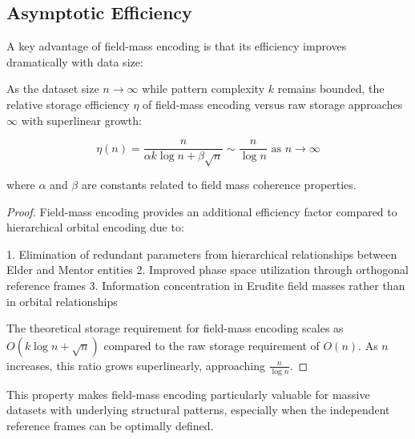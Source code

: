 \subsection{Asymptotic Efficiency}

A key advantage of field-mass encoding is that its efficiency improves dramatically with data size:

\begin{proposition}
As the dataset size $n \to \infty$ while pattern complexity $k$ remains bounded, the relative storage efficiency $\eta$ of field-mass encoding versus raw storage approaches $\infty$ with superlinear growth:

\begin{equation}
\eta(n) = \frac{n}{\alpha k \log n + \beta \sqrt{n}} \sim \frac{n}{\log n} \text{ as } n \to \infty
\end{equation}

where $\alpha$ and $\beta$ are constants related to field mass coherence properties.
\end{proposition}

\begin{proof}
Field-mass encoding provides an additional efficiency factor compared to hierarchical orbital encoding due to:

1. Elimination of redundant parameters from hierarchical relationships between Elder and Mentor entities
2. Improved phase space utilization through orthogonal reference frames
3. Information concentration in Erudite field masses rather than in orbital relationships

The theoretical storage requirement for field-mass encoding scales as $O(k \log n + \sqrt{n})$ compared to the raw storage requirement of $O(n)$. As $n$ increases, this ratio grows superlinearly, approaching $\frac{n}{\log n}$.
\end{proof}

This property makes field-mass encoding particularly valuable for massive datasets with underlying structural patterns, especially when the independent reference frames can be optimally defined.


